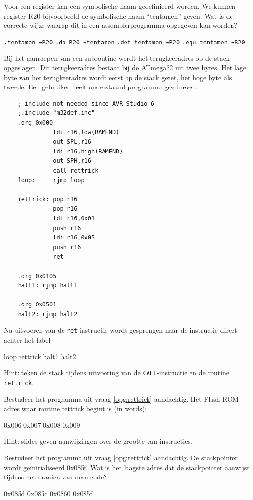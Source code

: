 \documentclass[a4paper,12pt,fleqn,dutch,mimicwordtwentyten]{tisdexam}
\begin{document}
\begin{questions}
\question
\label{opg:opg21}
Voor een register kan een symbolische naam gedefinieerd worden. We kunnen
register R20 bijvoorbeeld de symbolische naam ``tentamen'' geven. Wat is de
correcte wijze waarop dit in een assemblerprogramma opgegeven kan worden?
\begin{choices}
\choice \texttt{.tentamen =R20}
\choice \texttt{.db R20 =tentamen}
\CorrectChoice \label{ans:opg21} \texttt{.def tentamen =R20}
\choice \texttt{.equ tentamen =R20}
\end{choices}


\question
\label{opg:opg22}
\label{opg:rettrick}
Bij het aanroepen van een subroutine wordt het terugkeeradres op de stack opgeslagen. Dit
terugkeeradres bestaat bij de ATmega32 uit twee bytes. Het lage byte van het terugkeeradres
wordt eerst op de stack gezet, het hoge byte als tweede. Een gebruiker heeft onderstaand
programma geschreven.
\begin{lstlisting}
    ; include not needed since AVR Studio 6
    ;.include "m32def.inc"
    .org 0x000
              ldi r16,low(RAMEND)
              out SPL,r16
              ldi r16,high(RAMEND)
              out SPH,r16
              call rettrick
    loop:     rjmp loop
    
    rettrick: pop r16
              pop r16
              ldi r16,0x01
              push r16
              ldi r16,0x05
              push r16
              ret

    .org 0x0105
    halt1: rjmp halt1
    
    .org 0x0501
    halt2: rjmp halt2
\end{lstlisting}
Na uitvoeren van de \texttt{ret}-instructie wordt gesprongen naar de instructie direct achter het label
\begin{choices}
	\choice loop
	\choice rettrick
	\choice halt1
	\CorrectChoice \label{ans:opg22} halt2
\end{choices}
Hint: teken de stack tijdens uitvoering van de \texttt{CALL}-instructie en de routine \texttt{rettrick}.


\question
\label{opg:opg23}
Bestudeer het programma uit vraag \ref{opg:rettrick} aandachtig. Het Flash-ROM adres waar routine
rettrick begint is (in words):
\begin{choices}
	\choice 0x006
	\CorrectChoice \label{ans:opg23} 0x007
	\choice 0x008
	\choice 0x009
\end{choices}
Hint: slides geven aanwijzingen over de grootte van instructies.


\question
\label{opg:opg24}
Bestudeer het programma uit vraag \ref{opg:rettrick} aandachtig. De
stackpointer wordt ge\"{i}nitialiseerd 0x085f. Wat is het laagste adres dat de
stackpointer aanwijst tijdens het draaien van deze code?
\begin{choices}
	\CorrectChoice \label{ans:opg24} 0x085d
	\choice 0x085c
	\choice 0x0860
	\choice 0x085f
\end{choices}



\end{questions}
\end{document}
